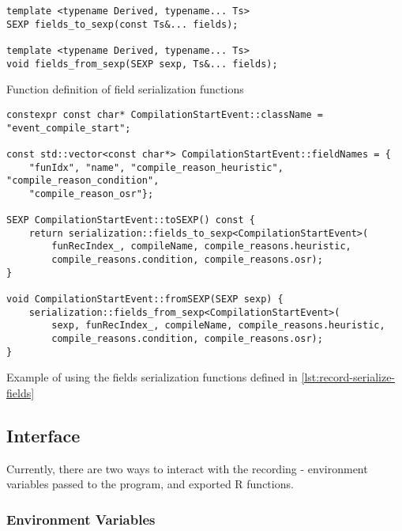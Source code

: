 \begin{listing}
	\begin{verbatim}
template <typename Derived, typename... Ts>
SEXP fields_to_sexp(const Ts&... fields);

template <typename Derived, typename... Ts>
void fields_from_sexp(SEXP sexp, Ts&... fields);
  \end{verbatim}
	\caption{Function definition of field serialization functions}\label{lst:record-serialize-fields}
\end{listing}

\begin{listing}
	\begin{verbatim}
constexpr const char* CompilationStartEvent::className = "event_compile_start";

const std::vector<const char*> CompilationStartEvent::fieldNames = {
    "funIdx", "name", "compile_reason_heuristic", "compile_reason_condition",
    "compile_reason_osr"};

SEXP CompilationStartEvent::toSEXP() const {
    return serialization::fields_to_sexp<CompilationStartEvent>(
        funRecIndex_, compileName, compile_reasons.heuristic,
        compile_reasons.condition, compile_reasons.osr);
}

void CompilationStartEvent::fromSEXP(SEXP sexp) {
    serialization::fields_from_sexp<CompilationStartEvent>(
        sexp, funRecIndex_, compileName, compile_reasons.heuristic,
        compile_reasons.condition, compile_reasons.osr);
}
  \end{verbatim}
	\caption{Example of using the fields serialization functions defined in \ref{lst:record-serialize-fields}}\label{lst:record-serialize-compstart}
\end{listing}

\subsection{Interface}

Currently, there are two ways to interact with the recording - environment variables passed to the program, and exported R functions.

\subsubsection*{Environment Variables}

